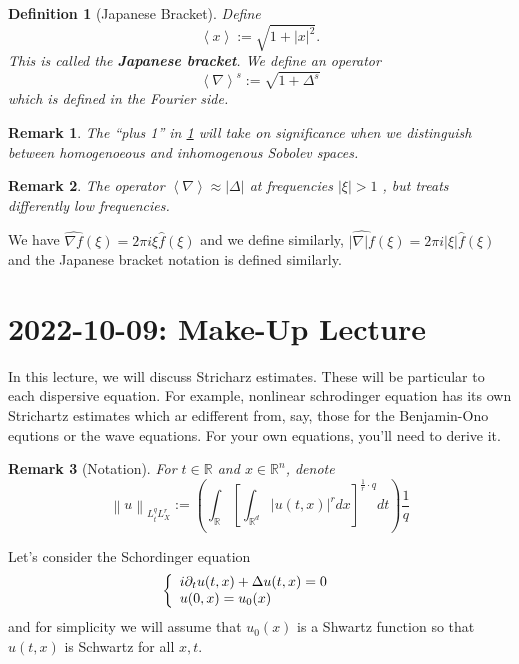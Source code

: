 \documentclass{article}
\newtheorem{definition}{Definition}
\newtheorem{remark}{Remark}
\def\R{\mathbb{R}} %
\newcommand\norm[1]{\left\lVert#1\right\rVert}
\begin{document}
\begin{definition}[Japanese Bracket]
  \label{def:japanese-bracket}
  Define
  \begin{equation*}
    \left\langle x \right\rangle := \sqrt{1+|x|^{2}}.
  \end{equation*}
  This is called the \textbf{Japanese bracket}. We define an operator
  \begin{equation*}
    \left\langle \nabla \right\rangle^{s}:= \sqrt{1+\Delta^{s}}
  \end{equation*}
  which is defined in the Fourier side.
\end{definition}
\begin{remark}
  The ``plus 1'' in \cref{def:japanese-bracket} will take on significance when
  we distinguish between homogenoeous and inhomogenous Sobolev spaces.
\end{remark}
\begin{remark}
  The operator $\left\langle \nabla \right\rangle \approx |\Delta|$ at
  frequencies $|\xi|>1$ , but treats differently low frequencies.
\end{remark}
We have $\widehat{\nabla f}(\xi)=2\pi i \xi \hat{f}(\xi) $ and we define
similarly, $\widehat{|\nabla| f}(\xi)=2\pi i |\xi| \hat{f}(\xi) $  and the
Japanese bracket notation is defined similarly.

\section{2022-10-09: Make-Up Lecture}
In this lecture, we will discuss Stricharz estimates. These will be particular
to each dispersive equation. For example, nonlinear schrodinger equation has its
own Strichartz estimates which ar edifferent from, say,  those for the
Benjamin-Ono equtions or the wave equations. For your own equations, you'll need
to derive it.

\begin{remark}[Notation]
  For $t\in \R$ and $x\in \R^n$, denote
  \begin{equation*}
    \norm{u}_{L_{t}^{q}L_{X}^{r}}:= \left(  \int_{\R} \left[ \int_{\R^d}\left| u(t,x) \right|^{r}dx \right]^{\frac{1}{r}\cdot q}dt  \right) \frac{1}{q}
  \end{equation*}
\end{remark}
Let's consider the Schordinger equation
\begin{equation}\label{eq:nonlinear-schrodinger}
  \left\{ \begin{array}{l@{\quad\quad}l}
      i\partial_{t}u(t,x) +\Delta u(t,x) = 0 \\
      u(0,x)=u_{0}(x) 
    \end{array}\right.
\end{equation}
and for simplicity we will assume that $u_{0}(x)$ is a Shwartz function so that
$u(t,x)$ is Schwartz for all $x,t$.
\end{document}
